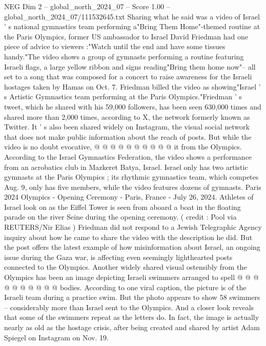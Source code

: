 \begin{textsample}{NEG Dim 2 – global\_north\_2024\_07 – Score 1.00 – global\_north\_2024\_07/111532645.txt}  \label{ex:f2_neg_061}
Sharing what he said was a video of Israel ' s national gymnastics team performing a"Bring Them Home"-themed routine at the Paris Olympics, former US ambassador to Israel David Friedman had one piece of advice to viewers :"Watch until the end and have some tissues handy."The video shows a group of gymnasts performing a routine featuring Israeli flags, a large yellow ribbon and signs reading"Bring them home now"-- all set to a song that was composed for a concert to raise awareness for the Israeli hostages taken by Hamas on Oct. 7.
Friedman billed the video as showing"Israel ' s Artistic Gymnastics team performing at the Paris Olympics."Friedman ' s tweet, which he shared with his 59,000 followers, has been seen 630,000 times and shared more than 2,000 times, according to X, the network formerly known as Twitter.
It ' s also been shared widely on Instagram, the visual social network that does not make public information about the reach of posts.
But while the video is no doubt evocative, @ @ @ @ @ @ @ @ @ @ it from the Olympics.
According to the Israel Gymnastics Federation, the video shows a performance from an acrobatics club in Mazkeret Batya, Israel.
Israel only has two artistic gymnasts at the Paris Olympics ; its rhythmic gymnastics team, which competes Aug. 9, only has five members, while the video features dozens of gymnasts.
Paris 2024 Olympics - Opening Ceremony - Paris, France - July 26, 2024.
Athletes of Israel look on as the Eiffel Tower is seen from aboard a boat in the floating parade on the river Seine during the opening ceremony. ( credit : Pool via REUTERS/Nir Elias ) Friedman did not respond to a Jewish Telegraphic Agency inquiry about how he came to share the video with the description he did.
But the post offers the latest example of how misinformation about Israel, an ongoing issue during the Gaza war, is affecting even seemingly lighthearted posts connected to the Olympics.
Another widely shared visual ostensibly from the Olympics has been an image depicting Israeli swimmers arranged to spell @ @ @ @ @ @ @ @ @ @ bodies.
According to one viral caption, the picture is of the Israeli team during a practice swim.
But the photo appears to show 58 swimmers -- considerably more than Israel sent to the Olympics.
And a closer look reveals that some of the swimmers repeat as the letters do.
In fact, the image is actually nearly as old as the hostage crisis, after being created and shared by artist Adam Spiegel on Instagram on Nov. 19.

\end{textsample}
